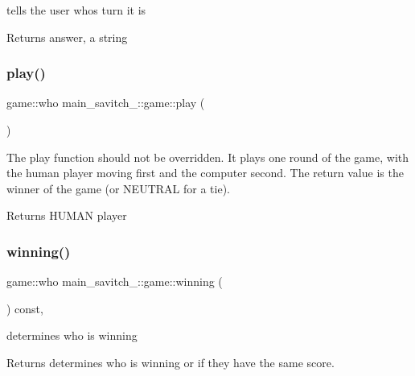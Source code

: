 tells the user whos turn it is 

\begin{DoxyReturn}{Returns}
answer, a string 
\end{DoxyReturn}
\mbox{\label{classmain__savitch__14_1_1game_a4dbeaddb78059f7c5dcbf5cc4e026317}} 
\subsubsection{\texorpdfstring{play()}{play()}}
{\footnotesize\ttfamily game\+::who main\+\_\+savitch\+\_\+::game\+::play (\begin{DoxyParamCaption}{ }\end{DoxyParamCaption})}



The play function should not be overridden. It plays one round of the game, with the human player moving first and the computer second. The return value is the winner of the game (or N\+E\+U\+T\+R\+AL for a tie). 

\begin{DoxyReturn}{Returns}
H\+U\+M\+AN player 
\end{DoxyReturn}
\mbox{\label{classmain__savitch__14_1_1game_a2f0d5338c12bd98d52fe2383ece5c45e}} 
\subsubsection{\texorpdfstring{winning()}{winning()}}
{\footnotesize\ttfamily game\+::who main\+\_\+savitch\+\_\+::game\+::winning (\begin{DoxyParamCaption}{ }\end{DoxyParamCaption}) const\hspace{0.3cm}{\ttfamily [protected]}, {\ttfamily [virtual]}}



determines who is winning 

\begin{DoxyReturn}{Returns}
determines who is winning or if they have the same score. 
\end{DoxyReturn}



